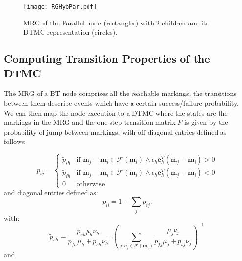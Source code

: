 \begin{figure}[h]
\centering
\texttt{[image: RGHybPar.pdf]}
\caption{MRG of the Parallel node (rectangles) with $2$ children and its DTMC representation (circles).}
\label{stoch:app.fig.par}
\end{figure}

\subsection{Computing Transition Properties of the DTMC}
The MRG of a BT node comprises all the reachable markings, the transitions between them describe events which have a certain success/failure probability.  We can then map the node execution to a DTMC where the states are the markings in the MRG and the one-step transition matrix $P$ is given by the probability of jump between markings, with off diagonal entries defined as follows:

\begin{equation}
p_{ij}=
   \begin{cases}
   \tilde p_{sh} & \!\!\!\text{if } \mathbf{m}_j-\mathbf{m}_i\in \mathcal{F}(\mathbf{m}_i) \land  e_h\mathbf{e}_h^T(\mathbf{m}_j-\mathbf{m}_i)>0\\
   \tilde p_{fh} & \!\!\!\text{if } \mathbf{m}_j-\mathbf{m}_i\in \mathcal{F}(\mathbf{m}_i) \land  e_h\mathbf{e}_h^T(\mathbf{m}_j-\mathbf{m}_i)<0\\
   0 & \!\!\!\text{otherwise}
  \end{cases} 
\end{equation}
and diagonal entries defined as:
\begin{equation}
p_{ii}=1-\sum_{j}p_{ij}. 
\end{equation}
 with:
\begin{equation}
\tilde p_{sh} = \frac{p_{sh} \mu_h \nu_h}{p_{fh} \mu_h + p_{sh}\nu_h} \cdot \left( \sum_{j: \mathbf{e}_j \in \mathcal{F}(\mathbf{m}_i)} \frac{\mu_j \nu_j}{p_{fj} \mu_j + p_{sj}\nu_j} \right)^{-1}
\end{equation} 
and

